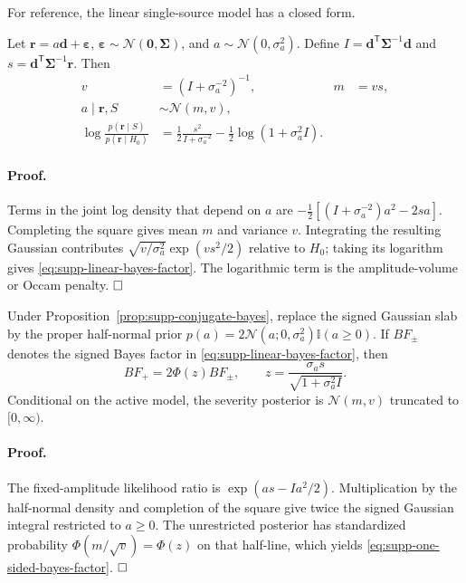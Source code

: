 For reference, the linear single-source model has a closed form.

\begin{proposition}
Let $\bm r=a\bm d+\bm\varepsilon$, $\bm\varepsilon\sim\mathcal N(\bm0,\bm\Sigma)$, and $a\sim\mathcal N(0,\sigma_a^2)$. Define
$I=\bm d^{\mathsf T}\bm\Sigma^{-1}\bm d$ and
$s=\bm d^{\mathsf T}\bm\Sigma^{-1}\bm r$. Then
\begin{align}
 v&=(I+\sigma_a^{-2})^{-1},
 &m&=vs,\\
 a\mid\bm r,S&\sim\mathcal N(m,v),\\
 \log\frac{p(\bm r\mid S)}{p(\bm r\mid H_0)}
 &=\tfrac12\frac{s^2}{I+\sigma_a^{-2}}
 -\tfrac12\log(1+\sigma_a^2I).
 \label{eq:supp-linear-bayes-factor}
\end{align}
\label{prop:supp-conjugate-bayes}
\end{proposition}

\paragraph{Proof.}
Terms in the joint log density that depend on $a$ are
$-\tfrac12[(I+\sigma_a^{-2})a^2-2sa]$.
Completing the square gives mean $m$ and variance $v$. Integrating the resulting Gaussian contributes
$\sqrt{v/\sigma_a^2}\exp(vs^2/2)$ relative to $H_0$; taking its logarithm gives \eqref{eq:supp-linear-bayes-factor}. The logarithmic term is the amplitude-volume or Occam penalty. $\hfill\square$

\begin{corollary}
Under Proposition~\ref{prop:supp-conjugate-bayes}, replace the signed Gaussian
slab by the proper half-normal prior
$p(a)=2\mathcal N(a;0,\sigma_a^2)\mathbb I(a\ge0)$. If
$BF_{\pm}$ denotes the signed Bayes factor in
\eqref{eq:supp-linear-bayes-factor}, then
\begin{equation}
 BF_{+}=2\Phi(z)BF_{\pm},
 \qquad
 z=\frac{\sigma_a s}{\sqrt{1+\sigma_a^2I}}.
 \label{eq:supp-one-sided-bayes-factor}
\end{equation}
Conditional on the active model, the severity posterior is
$\mathcal N(m,v)$ truncated to $[0,\infty)$.
\end{corollary}

\paragraph{Proof.}
The fixed-amplitude likelihood ratio is
$\exp(as-Ia^2/2)$. Multiplication by the half-normal density and completion of
the square give twice the signed Gaussian integral restricted to $a\ge0$.
The unrestricted posterior has standardized probability
$\Phi(m/\sqrt v)=\Phi(z)$ on that half-line, which yields
\eqref{eq:supp-one-sided-bayes-factor}. $\hfill\square$

